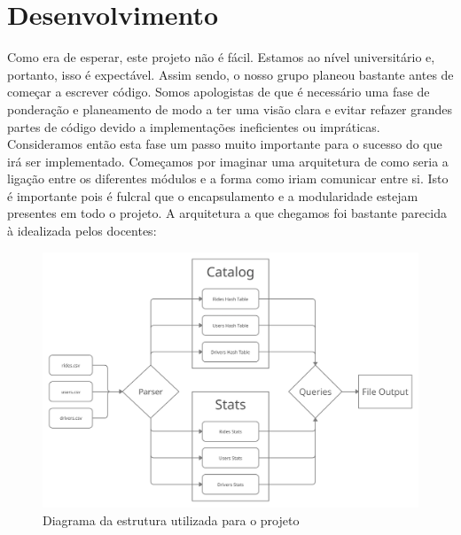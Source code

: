 \documentclass[12pt,a4paper]{report}
\begin{document}
    \chapter{Desenvolvimento} 
    Como era de esperar, este projeto não é fácil. Estamos ao nível universitário e, portanto, isso é expectável. Assim sendo, o nosso grupo planeou bastante antes de começar a escrever código. Somos apologistas de que é necessário uma fase de ponderação e planeamento de modo a ter uma visão clara e evitar refazer grandes partes de código devido a implementações ineficientes ou impráticas. Consideramos então esta fase um passo muito importante para o sucesso do que irá ser implementado. Começamos por imaginar uma arquitetura de como seria a ligação entre os diferentes módulos e a forma como iriam comunicar entre si. Isto é importante pois é fulcral que o encapsulamento e a modularidade estejam presentes em todo o projeto.
    A arquitetura a que chegamos foi bastante parecida à idealizada pelos docentes: 
    \begin{figure}[h]
    \includegraphics[scale = 0.14]{diagram1.png}
    \centering
    \caption{Diagrama da estrutura utilizada para o projeto}
    \end{figure} \\
\end{document}

